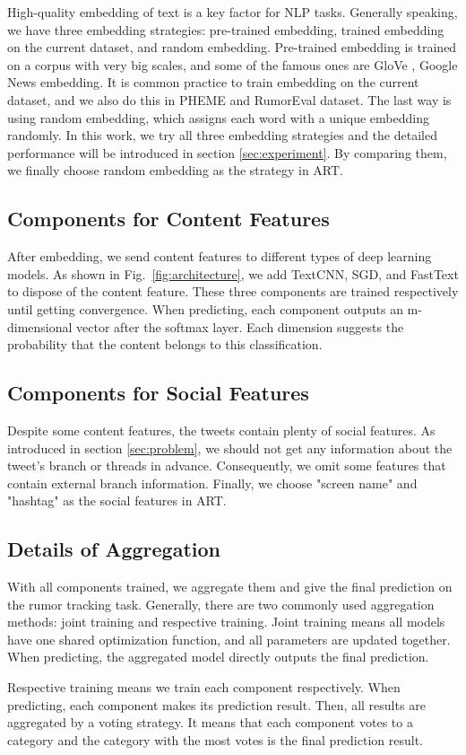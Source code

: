 High-quality embedding of text is a key factor for NLP tasks. Generally speaking, we have three embedding strategies: pre-trained embedding, trained embedding on the current dataset, and random embedding. Pre-trained embedding is trained on a corpus with very big scales, and some of the famous ones are GloVe \cite{pennington2014glove}, Google News embedding\cite{DBLP:journals/corr/abs-1301-3781}. It is common practice to train embedding on the current dataset, and we also do this in PHEME and RumorEval dataset. The last way is using random embedding, which assigns each word with a unique embedding randomly. In this work, we try all three embedding strategies and the detailed performance will be introduced in section \ref{sec:experiment}. By comparing them, we finally choose random embedding as the strategy in ART.

\subsection{Components for Content Features}
After embedding, we send content features to different types of deep learning models. As shown in Fig.~\ref{fig:architecture}, we add TextCNN, SGD, and FastText to dispose of the content feature. These three components are trained respectively until getting convergence. When predicting, each component outputs an m-dimensional vector after the softmax layer. Each dimension suggests the probability that the content belongs to this classification.

\subsection{Components for Social Features}
Despite some content features, the tweets contain plenty of social features. As introduced in section \ref{sec:problem}, we should not get any information about the tweet's branch or threads in advance. Consequently, we omit some features that contain external branch information. Finally, we choose "screen name" and "hashtag" as the social features in ART. 

\subsection{Details of Aggregation}
With all components trained, we aggregate them and give the final prediction on the rumor tracking task. Generally, there are two commonly used aggregation methods: joint training and respective training. Joint training means all models have one shared optimization function, and all parameters are updated together. When predicting, the aggregated model directly outputs the final prediction.

Respective training means we train each component respectively. When predicting, each component makes its prediction result. Then, all results are aggregated by a voting strategy. It means that each component votes to a category and the category with the most votes is the final prediction result.
